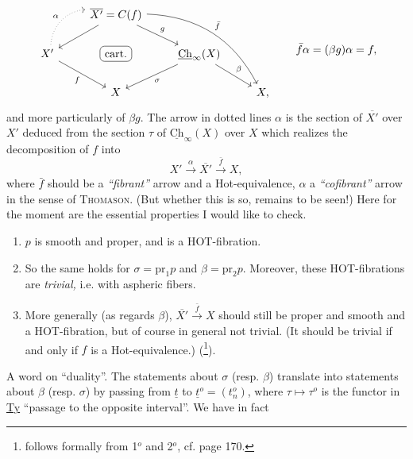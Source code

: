 \documentclass[11pt]{article}
\newcommand{\printedpage}[1]{\marginpar{\footnotesize p.~#1}}
\newcommand{\msp}[1]{\marginpar{\footnotesize [#1]}}
\newcommand{\uCh}{\underline{\mathrm{Ch}}}
\begin{document}
\[
\begin{tikzcd}
& \overline{X'}=C(f) \arrow[dl] \arrow[dr, "g"] \arrow[ddrr, bend left=30, "\bar{f}"] & & \\
X' \arrow[ur, dotted, bend left=40, "\alpha"] \arrow[dr, "f"'] & |[draw, rounded corners]| \text{cart.} & \uCh_\infty(X) \arrow[dl, "\sigma"] \arrow[dr, "\beta"] & \\
& X & & X,
\end{tikzcd}
\qquad
\bar{f}\alpha=(\beta g)\alpha=f,
\]
and more particularly of $\beta g$. The arrow
\msp{page 139}
in dotted lines $\alpha$ is the section of $\overline{X'}$ over $X'$ deduced from the section $\tau$ of $\uCh_\infty(X)$ over $X$ which realizes the decomposition of $f$ into
\[
X'\xrightarrow{\ \alpha\ }\overline{X'}\xrightarrow{\ \bar{f}\ }X,
\]
where $\bar{f}$ should be a \textit{``fibrant''} arrow and a Hot-equivalence, $\alpha$ a \textit{``cofibrant''} arrow in the sense of \textsc{Thomason}. (But whether this is so, remains to be seen!) Here for the moment are the essential properties I would like to check.

\begin{enumerate}[label={}, leftmargin=*]
\item[1$^o$)] $p$ is smooth and proper, and is a HOT-fibration.

\item[2$^o$)] So the same holds for $\sigma=\mathrm{pr}_1p$ and $\beta=\mathrm{pr}_2p$. Moreover, these HOT-fibrations are \textit{trivial,} i.e. with aspheric fibers.

\printedpage{87}

\item[3$^o$)] More generally (as regards $\beta$), $\overline{X'}\xrightarrow{\ \bar{f}\ }X$ should still be proper and smooth and a HOT-fibration, but of course in general not trivial. (It should be trivial if and only if $f$ is a Hot-equivalence.) (\footnote[30]{follows formally from 1$^o$ and 2$^o$, cf. page 170.}).
\end{enumerate}

A word on ``duality''. The statements about $\sigma$ (resp. $\beta$) translate into statements about $\beta$ (resp. $\sigma$) by passing from $\underline{t}$ to $\underline{t}^o=(t^o_n)$, where $\tau\longmapsto\tau^o$ is the functor in \underline{Ty} ``passage to the opposite interval''. We have in fact %

\msp{page 140}
\end{document}
